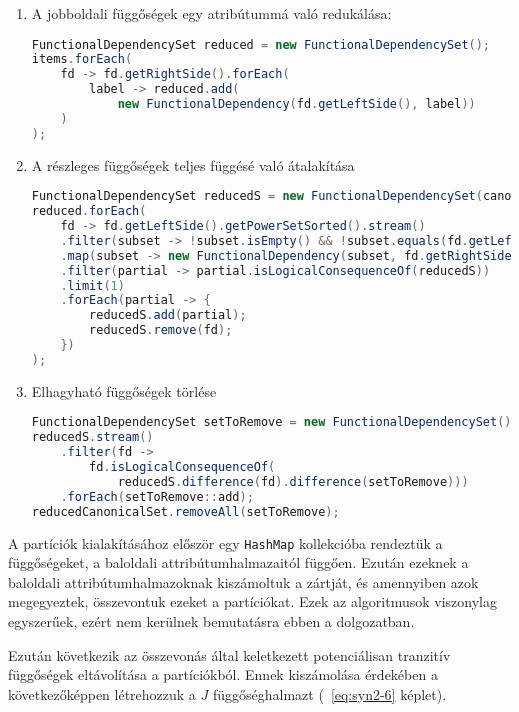 \begin{enumerate}

    \item A jobboldali függőségek egy atribútummá való redukálása:
    
\linespread{1}
\begin{lstlisting}[language=Java]
FunctionalDependencySet reduced = new FunctionalDependencySet();
items.forEach(
	fd -> fd.getRightSide().forEach(
		label -> reduced.add(
			new FunctionalDependency(fd.getLeftSide(), label))
	)
);
\end{lstlisting}

    \item A részleges függőségek teljes függésé való átalakítása
    
\linespread{1}
\begin{lstlisting}[language=Java]
FunctionalDependencySet reducedS = new FunctionalDependencySet(canonicalSet);
reduced.forEach(
	fd -> fd.getLeftSide().getPowerSetSorted().stream()
	.filter(subset -> !subset.isEmpty() && !subset.equals(fd.getLeftSide()))
	.map(subset -> new FunctionalDependency(subset, fd.getRightSide()))
	.filter(partial -> partial.isLogicalConsequenceOf(reducedS))
	.limit(1)
	.forEach(partial -> {
		reducedS.add(partial);
		reducedS.remove(fd);
	})
);
\end{lstlisting}

    \item Elhagyható függőségek törlése
    
\linespread{1}
\begin{lstlisting}[language=Java]
FunctionalDependencySet setToRemove = new FunctionalDependencySet();
reducedS.stream()
	.filter(fd ->
		fd.isLogicalConsequenceOf(
			reducedS.difference(fd).difference(setToRemove)))
	.forEach(setToRemove::add);
reducedCanonicalSet.removeAll(setToRemove);
\end{lstlisting}
\end{enumerate}

A partíciók kialakításához először egy \lstinline{HashMap} kollekcióba rendeztük a függőségeket, a baloldali attribútumhalmazaitól függően. Ezután ezeknek a baloldali attribútumhalmazoknak kiszámoltuk a zártját, és amennyiben azok megegyeztek, összevontuk ezeket a partíciókat. Ezek az algoritmusok viszonylag egyszerűek, ezért nem kerülnek bemutatásra ebben a dolgozatban.

Ezután következik az összevonás által keletkezett potenciálisan tranzitív függőségek eltávolítása a partíciókból. Ennek kiszámolása érdekében a következőképpen létrehozzuk a $J$ függőséghalmazt (~\ref{eq:syn2-6} képlet).

